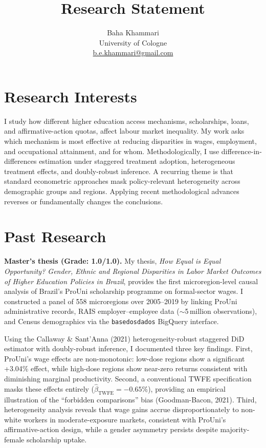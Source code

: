 \documentclass[a4paper,11pt]{article}
\title{Research Statement}
\author{Baha Khammari \\ University of Cologne \\ \href{mailto:b.e.khammari@gmail.com}{b.e.khammari@gmail.com}}
\date{}
\begin{document}
\maketitle
\thispagestyle{empty}

\section*{Research Interests}

I study how different higher education access mechanisms, scholarships, loans, and affirmative-action quotas, affect labour market inequality. My work asks which mechanism is most effective at reducing disparities in wages, employment, and occupational attainment, and for whom. Methodologically, I use difference-in-differences estimation under staggered treatment adoption, heterogeneous treatment effects, and doubly-robust inference. A recurring theme is that standard econometric approaches mask policy-relevant heterogeneity across demographic groups and regions. Applying recent methodological advances reverses or fundamentally changes the conclusions.

\section*{Past Research}

\textbf{Master's thesis (Grade: 1.0/1.0).} My thesis, \textit{How Equal is Equal Opportunity? Gender, Ethnic and Regional Disparities in Labor Market Outcomes of Higher Education Policies in Brazil}, provides the first microregion-level causal analysis of Brazil's ProUni scholarship programme on formal-sector wages. I constructed a panel of 558 microregions over 2005--2019 by linking ProUni administrative records, RAIS employer--employee data ($\sim$5\,million observations), and Census demographics via the \texttt{basedosdados} BigQuery interface.

Using the Callaway \& Sant'Anna (2021) heterogeneity-robust staggered DiD estimator with doubly-robust inference, I documented three key findings. First, ProUni's wage effects are non-monotonic: low-dose regions show a significant +3.04\% effect, while high-dose regions show near-zero returns consistent with diminishing marginal productivity. Second, a conventional TWFE specification masks these effects entirely ($\hat{\beta}_{\text{TWFE}} = -0.65\%$), providing an empirical illustration of the ``forbidden comparisons'' bias (Goodman-Bacon, 2021). Third, heterogeneity analysis reveals that wage gains accrue disproportionately to non-white workers in moderate-exposure markets, consistent with ProUni's affirmative-action design, while a gender asymmetry persists despite majority-female scholarship uptake.
\end{document}
